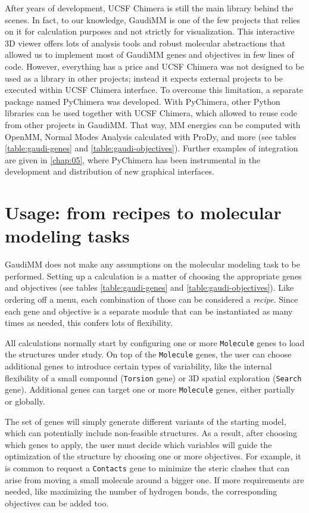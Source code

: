 After years of development, UCSF Chimera is still the main library behind the scenes. In fact, to our knowledge, GaudiMM is one of the few projects that relies on it for calculation purposes and not strictly for visualization. This interactive 3D viewer offers lots of analysis tools and robust molecular abstractions that allowed us to implement most of GaudiMM genes and objectives in few lines of code. However, everything has a price and UCSF Chimera was not designed to be used as a library in other projects; instead it expects external projects to be executed within UCSF Chimera interface. To overcome this limitation, a separate package named PyChimera was developed. With PyChimera, other Python libraries can be used together with UCSF Chimera, which allowed to reuse code from other projects in GaudiMM. That way, MM energies can be computed with OpenMM, Normal Modes Analysis calculated with ProDy, and more (see tables \ref{table:gaudi-genes} and \ref{table:gaudi-objectives}). Further examples of integration are given in \autoref{chap:05}, where PyChimera has been instrumental in the development and distribution of new graphical interfaces.

\section{Usage: from recipes to molecular modeling tasks}

GaudiMM does not make any assumptions on the molecular modeling task to be performed. Setting up a calculation is a matter of choosing the appropriate genes and objectives (see tables \ref{table:gaudi-genes} and \ref{table:gaudi-objectives}). Like ordering off a menu, each combination of those can be considered a \textit{recipe}. Since each gene and objective is a separate module that can be instantiated as many times as needed, this confers lots of flexibility.

All calculations normally start by configuring one or more \texttt{Molecule} genes to load the structures under study. On top of the \texttt{Molecule} genes, the user can choose additional genes to introduce certain types of variability, like the internal flexibility of a small compound (\texttt{Torsion} gene) or 3D spatial exploration (\texttt{Search} gene). Additional genes can target one or more \texttt{Molecule} genes, either partially or globally.

The set of genes will simply generate different variants of the starting model, which can potentially include non-feasible structures. As a result, after choosing which genes to apply, the user must decide which variables will guide the optimization of the structure by choosing one or more objectives. For example, it is common to request a \texttt{Contacts} gene to minimize the steric clashes that can arise from moving a small molecule around a bigger one.  If more requirements are needed, like maximizing the number of hydrogen bonds, the corresponding objectives can be added too.

